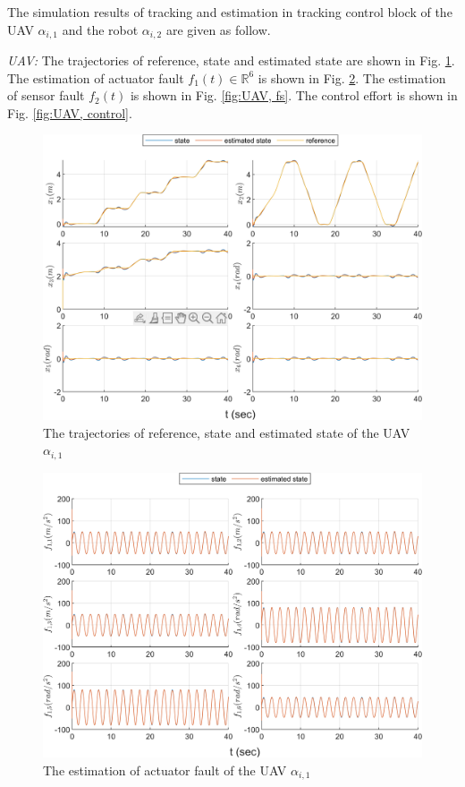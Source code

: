 \documentclass{ieeeaccess}
\begin{document}
The simulation results of tracking and estimation in tracking control block of the UAV $\alpha_{i,1}$ and the robot $\alpha_{i,2}$ are given as follow.

\textit{UAV:}
The trajectories of reference, state and estimated state are shown in Fig. \ref{fig:UAV, state}. The estimation of actuator fault $f_1(t)\in\mathbb{R}^6$ is shown in Fig. \ref{fig:UAV, fa}. The estimation of sensor fault $f_2(t)$ is shown in Fig. \ref{fig:UAV, fs}. The control effort is shown in Fig. \ref{fig:UAV, control}.
\begin{figure}[htbp]
    \centering
    \includegraphics[scale=.57]{fig/uav (1).png}\caption{The trajectories of reference, state and estimated state of the UAV $\alpha_{i,1}$}%
    \label{fig:UAV, state}
\end{figure}
\begin{figure}[htbp]
    \centering
    \includegraphics[scale=.57]{fig/uav (2).png}\caption{The estimation of actuator fault of the UAV $\alpha_{i,1}$}
    \label{fig:UAV, fa}
\end{figure}
\end{document}

